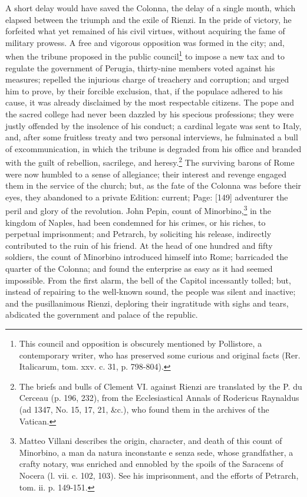 A short delay would have saved the Colonna, the delay of a single month, which elapsed between the triumph and the exile of Rienzi. In the pride of victory, he forfeited what yet remained of his civil virtues, without acquiring the fame of military prowess. A free and vigorous opposition was formed in the city; and, when the tribune proposed in the public council\footnote{This council and opposition is obscurely mentioned by Pollistore, a contemporary writer, who has preserved some curious and original facts (Rer. Italicarum, tom. xxv. c. 31, p. 798-804).} to impose a new tax and to regulate the government of Perugia, thirty-nine members voted against his measures; repelled the injurious charge of treachery and corruption; and urged him to prove, by their forcible exclusion, that, if the populace adhered to his cause, it was already disclaimed by the most respectable citizens. The pope and the sacred college had never been dazzled by his specious professions; they were justly offended by the insolence of his conduct; a cardinal legate was sent to Italy, and, after some fruitless treaty and two personal interviews, he fulminated a bull of excommunication, in which the tribune is degraded from his office and branded with the guilt of rebellion, sacrilege, and heresy.\footnote{The briefs and bulls of Clement VI. against Rienzi are translated by the P. du Cerceau (p. 196, 232), from the Ecclesiastical Annals of Rodericus Raynaldus (ad 1347, No. 15, 17, 21, \&c.), who found them in the archives of the Vatican.} The surviving barons of Rome were now humbled to a sense of allegiance; their interest and revenge engaged them in the service of the church; but, as the fate of the Colonna was before their eyes, they abandoned to a private Edition: current; Page: [149] adventurer the peril and glory of the revolution. John Pepin, count of Minorbino,\footnote{Matteo Villani describes the origin, character, and death of this count of Minorbino, a man da natura inconstante e senza sede, whose grandfather, a crafty notary, was enriched and ennobled by the spoils of the Saracens of Nocera (l. vii. c. 102, 103). See his imprisonment, and the efforts of Petrarch, tom. ii. p. 149-151.} in the kingdom of Naples, had been condemned for his crimes, or his riches, to perpetual imprisonment; and Petrarch, by soliciting his release, indirectly contributed to the ruin of his friend. At the head of one hundred and fifty soldiers, the count of Minorbino introduced himself into Rome; barricaded the quarter of the Colonna; and found the enterprise as easy as it had seemed impossible. From the first alarm, the bell of the Capitol incessantly tolled; but, instead of repairing to the well-known sound, the people was silent and inactive; and the pusillanimous Rienzi, deploring their ingratitude with sighs and tears, abdicated the government and palace of the republic.

